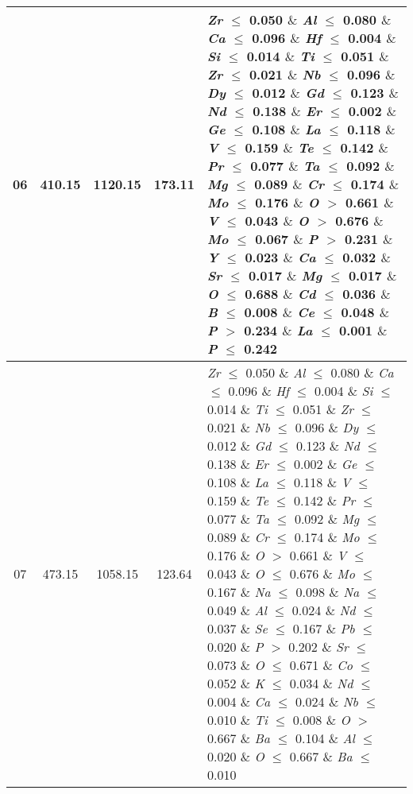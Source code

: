 \begin{table}[!htbp]
\begin{tabular}{ccccp{}}
		06 & 410.15 & 1120.15 & 173.11 & \textit{Zr} $\le$ 0.050 $\&$ \textit{Al} $\le$ 0.080 $\&$ \textit{Ca} $\le$ 0.096 $\&$ \textit{Hf} $\le$ 0.004 $\&$ \textit{Si} $\le$ 0.014 $\&$ \textit{Ti} $\le$ 0.051 $\&$ \textit{Zr} $\le$ 0.021 $\&$ \textit{Nb} $\le$ 0.096 $\&$ \textit{Dy} $\le$ 0.012 $\&$ \textit{Gd} $\le$ 0.123 $\&$ \textit{Nd} $\le$ 0.138 $\&$ \textit{Er} $\le$ 0.002 $\&$ \textit{Ge} $\le$ 0.108 $\&$ \textit{La} $\le$ 0.118 $\&$ \textit{V} $\le$ 0.159 $\&$ \textit{Te} $\le$ 0.142 $\&$ \textit{Pr} $\le$ 0.077 $\&$ \textit{Ta} $\le$ 0.092 $\&$ \textit{Mg} $\le$ 0.089 $\&$ \textit{Cr} $\le$ 0.174 $\&$ \textit{Mo} $\le$ 0.176 $\&$ \textit{O} $>$ 0.661 $\&$ \textit{V} $\le$ 0.043 $\&$ \textit{O} $>$ 0.676 $\&$ \textit{Mo} $\le$ 0.067 $\&$ \textit{P} $>$ 0.231 $\&$ \textit{Y} $\le$ 0.023 $\&$ \textit{Ca} $\le$ 0.032 $\&$ \textit{Sr} $\le$ 0.017 $\&$ \textit{Mg} $\le$ 0.017 $\&$ \textit{O} $\le$ 0.688 $\&$ \textit{Cd} $\le$ 0.036 $\&$ \textit{B} $\le$ 0.008 $\&$ \textit{Ce} $\le$ 0.048 $\&$ \textit{P} $>$ 0.234 $\&$ \textit{La} $\le$ 0.001 $\&$ \textit{P} $\le$ 0.242\\
		\hline
		07 & 473.15 & 1058.15 & 123.64 & \textit{Zr} $\le$ 0.050 $\&$ \textit{Al} $\le$ 0.080 $\&$ \textit{Ca} $\le$ 0.096 $\&$ \textit{Hf} $\le$ 0.004 $\&$ \textit{Si} $\le$ 0.014 $\&$ \textit{Ti} $\le$ 0.051 $\&$ \textit{Zr} $\le$ 0.021 $\&$ \textit{Nb} $\le$ 0.096 $\&$ \textit{Dy} $\le$ 0.012 $\&$ \textit{Gd} $\le$ 0.123 $\&$ \textit{Nd} $\le$ 0.138 $\&$ \textit{Er} $\le$ 0.002 $\&$ \textit{Ge} $\le$ 0.108 $\&$ \textit{La} $\le$ 0.118 $\&$ \textit{V} $\le$ 0.159 $\&$ \textit{Te} $\le$ 0.142 $\&$ \textit{Pr} $\le$ 0.077 $\&$ \textit{Ta} $\le$ 0.092 $\&$ \textit{Mg} $\le$ 0.089 $\&$ \textit{Cr} $\le$ 0.174 $\&$ \textit{Mo} $\le$ 0.176 $\&$ \textit{O} $>$ 0.661 $\&$ \textit{V} $\le$ 0.043 $\&$ \textit{O} $\le$ 0.676 $\&$ \textit{Mo} $\le$ 0.167 $\&$ \textit{Na} $\le$ 0.098 $\&$ \textit{Na} $\le$ 0.049 $\&$ \textit{Al} $\le$ 0.024 $\&$ \textit{Nd} $\le$ 0.037 $\&$ \textit{Se} $\le$ 0.167 $\&$ \textit{Pb} $\le$ 0.020 $\&$ \textit{P} $>$ 0.202 $\&$ \textit{Sr} $\le$ 0.073 $\&$ \textit{O} $\le$ 0.671 $\&$ \textit{Co} $\le$ 0.052 $\&$ \textit{K} $\le$ 0.034 $\&$ \textit{Nd} $\le$ 0.004 $\&$ \textit{Ca} $\le$ 0.024 $\&$ \textit{Nb} $\le$ 0.010 $\&$ \textit{Ti} $\le$ 0.008 $\&$ \textit{O} $>$ 0.667 $\&$ \textit{Ba} $\le$ 0.104 $\&$ \textit{Al} $\le$ 0.020 $\&$ \textit{O} $\le$ 0.667 $\&$ \textit{Ba} $\le$ 0.010\\
		\hline

\end{tabular}
\end{table}
